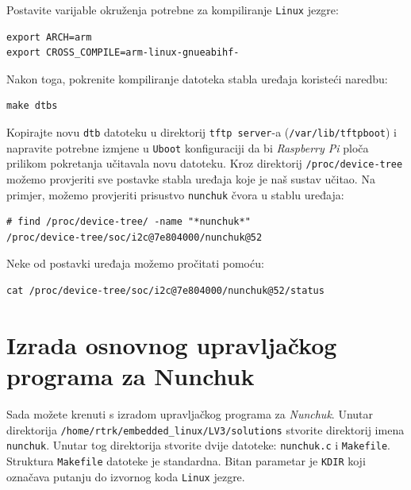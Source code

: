 \documentclass[11pt]{article}
\begin{document}
Postavite varijable okruženja potrebne za kompiliranje \texttt{Linux} jezgre:
\begin{lstlisting}
export ARCH=arm
export CROSS_COMPILE=arm-linux-gnueabihf-
\end{lstlisting}
Nakon toga, pokrenite kompiliranje datoteka stabla uređaja koristeći naredbu:
\begin{lstlisting}
make dtbs
\end{lstlisting}
Kopirajte novu \texttt{dtb} datoteku u direktorij \texttt{tftp server}-a
(\texttt{/var/lib/tftpboot}) i napravite potrebne izmjene u \texttt{Uboot}
konfiguraciji da bi \textit{Raspberry Pi} ploča prilikom pokretanja učitavala
novu datoteku.
\newline
\newline
Kroz direktorij \texttt{/proc/device-tree} možemo provjeriti sve postavke
stabla uređaja koje je naš sustav učitao.
\newline
\newline
Na primjer, možemo provjeriti prisustvo \texttt{nunchuk} čvora u stablu uređaja:
\begin{lstlisting}
# find /proc/device-tree/ -name "*nunchuk*"
/proc/device-tree/soc/i2c@7e804000/nunchuk@52
\end{lstlisting}
Neke od postavki uređaja možemo pročitati pomoću:
\begin{lstlisting}
cat /proc/device-tree/soc/i2c@7e804000/nunchuk@52/status
\end{lstlisting}

\section{Izrada osnovnog upravljačkog programa za Nunchuk}
Sada možete krenuti s izradom upravljačkog programa za \textit{Nunchuk}.
Unutar direktorija \texttt{/home/rtrk/embedded\_linux/LV3/solutions} stvorite
direktorij imena \texttt{nunchuk}. Unutar tog direktorija stvorite dvije
datoteke: \texttt{nunchuk.c} i \texttt{Makefile}.
\newline
\newline
Struktura \texttt{Makefile} datoteke je standardna. Bitan parametar je
\texttt{KDIR} koji označava putanju do izvornog koda \texttt{Linux} jezgre.
\newline
\newline
\end{document}
